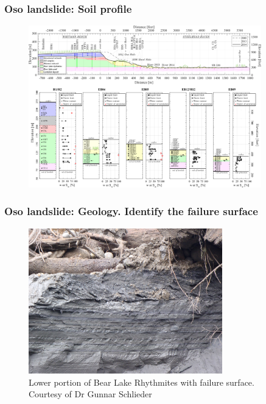 \documentclass[notes]{beamer}
\begin{document}
\begin{frame}
	\frametitle{Oso landslide: Soil profile}
	\begin{figure}
		\includegraphics[width=0.9\textwidth]{figs/oso/soil.png}
	\end{figure}
\end{frame}

\begin{frame}
	\frametitle{Oso landslide: Geology. Identify the failure surface}
	\begin{figure}
		\includegraphics[width=0.75\textwidth]{figs/oso/slip-surface.jpeg}
		\caption*{Lower portion of Bear Lake Rhythmites with failure surface. Courtesy of Dr Gunnar Schlieder}
	\end{figure}
\end{frame}
\end{document}
